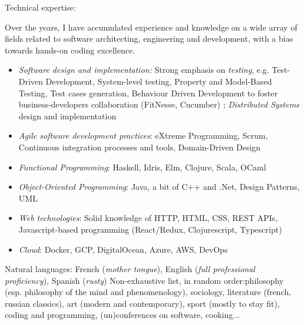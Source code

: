 \documentclass[12pt,a4paper]{article}
\begin{document}




\inlineheadsection
    {Technical expertise:}
    {Over the years, I have accumulated experience and knowledge on a wide array of fields related to software architecting, engineering and development, with a bias towards hands-on coding excellence.
      \begin{itemize}
      \item \emph{Software design and implementation:} Strong emphasis on \emph{testing}, e.g. Test-Driven Development, System-level testing, Property and Model-Based Testing, Test cases generation, Behaviour Driven Development to foster business-developers collaboration (FitNesse, Cucumber) ; \emph{Distributed Systems} design and implementation
      \item \emph{Agile software development practices}: eXtreme Programming, Scrum, Continuous integration processes and tools, Domain-Driven Design
      \item \emph{Functional Programming}: Haskell, Idris, Elm, Clojure, Scala, OCaml
      \item \emph{Object-Oriented Programming}: Java, a bit of C++ and .Net, Design Patterns, UML
      \item \emph{Web technologies}: Solid knowledge of HTTP, HTML, CSS, REST APIs, Javascript-based programming (React/Redux, Clojurescript, Typescript)
      \item \emph{Cloud}: Docker, GCP, DigitalOcean, Azure, AWS, DevOps
      \end{itemize}
    }
    \inlineheadsection
        {Natural languages:}
        {French (\emph{mother tongue}), English (\emph{full professional proficiency}), Spanish (\emph{rusty})}
\inlineheadsection
    {Non-exhaustive list, in random order:}{philosophy (esp. philosophy of the mind and phenomenology), sociology, literature (french, russian classics), art (modern and contemporary), sport (mostly to stay fit), coding and programming, (un)conferences on software, cooking...}
\end{document}
